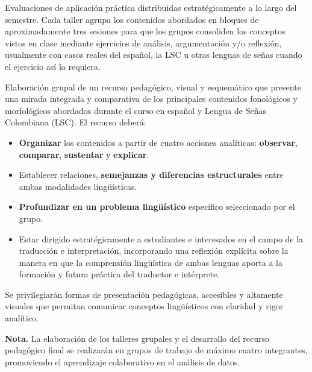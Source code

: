 \begin{description}[
    style=nextline,
    leftmargin=0pt,
    labelindent=0pt,
    labelwidth=0pt,
    labelsep=0pt,
    itemsep=7pt
]

\item[\textbf{Talleres Conceptuales Grupales (4)}]
Evaluaciones de aplicación práctica distribuidas estratégicamente a lo largo del semestre. 
Cada taller agrupa los contenidos abordados en bloques de aproximadamente tres sesiones para que los 
grupos consoliden los conceptos vistos en clase mediante ejercicios de análisis, argumentación y/o reflexión, 
usualmente con casos reales del español, la LSC u otras lenguas de señas cuando el ejercicio así lo requiera.

\item[\textbf{Trabajo Final Integrador: Recurso Pedagógico Bimodal}]
Elaboración grupal de un recurso pedagógico, visual y esquemático que presente una mirada integrada y comparativa
de los principales contenidos fonológicos y morfológicos abordados durante el curso en español y Lengua de Señas 
Colombiana (LSC). El recurso deberá:

\begin{itemize}[leftmargin=*,itemsep=3pt,topsep=4pt]
    \item \textbf{Organizar} los contenidos a partir de cuatro acciones analíticas: \textbf{observar}, \textbf{comparar}, \textbf{sustentar} y \textbf{explicar}.
    \item Establecer relaciones, \textbf{semejanzas y diferencias estructurales} entre ambas modalidades lingüísticas.
    \item \textbf{Profundizar en un problema lingüístico} específico seleccionado por el grupo.
    \item Estar dirigido estratégicamente a estudiantes e interesados en el campo de la traducción e interpretación, 
    incorporando una reflexión explícita sobre la manera en que la comprensión lingüística de ambas lenguas aporta a 
    la formación y futura práctica del traductor e intérprete.
\end{itemize}

Se privilegiarán formas de presentación pedagógicas, accesibles y altamente visuales que permitan comunicar conceptos 
lingüísticos con claridad y rigor analítico.

\end{description}

\textbf{Nota.}
La elaboración de los talleres grupales y el desarrollo del recurso pedagógico final se realizarán en grupos de trabajo 
de máximo cuatro integrantes, promoviendo el aprendizaje colaborativo en el análisis de datos.

